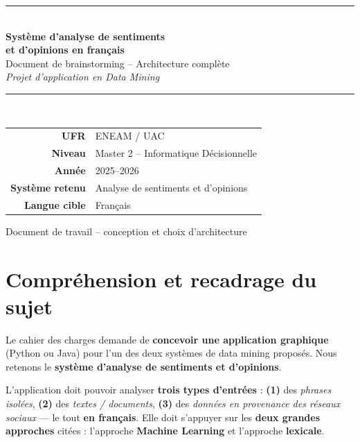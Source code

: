 \documentclass[11pt,a4paper]{article}
\begin{document}
\begin{titlepage}
\centering
\vspace*{2cm}
{\color{bleu}\rule{\linewidth}{1.2pt}}\\[0.6cm]
{\Huge\bfseries Système d'analyse de sentiments\\ et d'opinions en français}\\[0.4cm]
{\Large Document de brainstorming -- Architecture complète}\\[0.3cm]
{\large\itshape Projet d'application en Data Mining}\\[0.2cm]
{\color{bleu}\rule{\linewidth}{1.2pt}}\\[1.2cm]

\begin{tabular}{rl}
\textbf{UFR} & ENEAM / UAC\\
\textbf{Niveau} & Master 2 -- Informatique Décisionnelle\\
\textbf{Année} & 2025--2026\\
\textbf{Système retenu} & Analyse de sentiments et d'opinions\\
\textbf{Langue cible} & Français\\
\end{tabular}

\vfill
{\color{gris}\small Document de travail -- conception et choix d'architecture}
\end{titlepage}

\tableofcontents
\newpage

\section{Compréhension et recadrage du sujet}

Le cahier des charges demande de \textbf{concevoir une application graphique}
(Python ou Java) pour l'un des deux systèmes de data mining proposés. Nous
retenons le \textbf{système d'analyse de sentiments et d'opinions}.

\begin{repere}
L'application doit pouvoir analyser \textbf{trois types d'entrées} :
\textbf{(1)} des \emph{phrases isolées}, \textbf{(2)} des \emph{textes / documents},
\textbf{(3)} des \emph{données en provenance des réseaux sociaux} --- le tout
\textbf{en français}. Elle doit s'appuyer sur les \textbf{deux grandes approches}
citées : l'approche \textbf{Machine Learning} et l'approche \textbf{lexicale}.
\end{repere}
\end{document}
